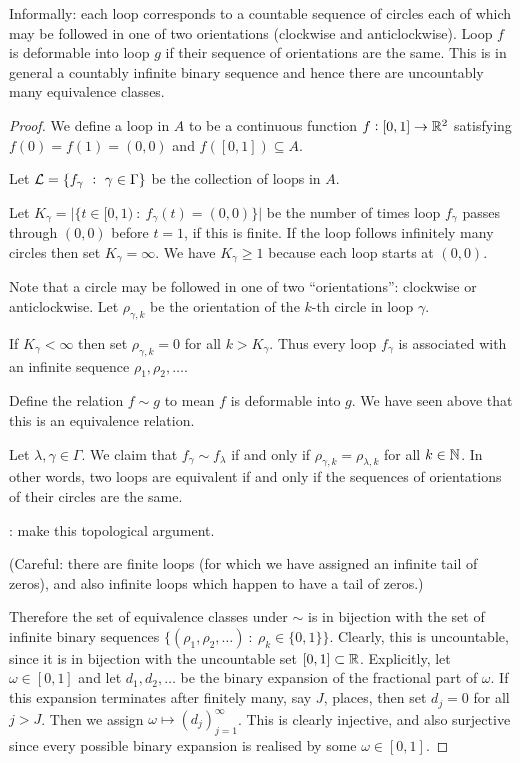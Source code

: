 \begin{enumerate}[label=(\alph*)]
  Informally: each loop corresponds to a countable sequence of circles each of which may be followed in one of
  two orientations (clockwise and anticlockwise). Loop $f$ is deformable into loop $g$ if their sequence of
  orientations are the same. This is in general a countably infinite binary sequence and hence there are
  uncountably many equivalence classes.

  \begin{proof}
    We define a loop in $A$ to be a continuous function $f: [0, 1] \to \mathbb{R}^2$ satisfying $f(0) = f(1) = (0, 0)$
    and $f([0, 1]) \subseteq A$.

    Let $\mathcal L = \{f_\gamma ~:~ \gamma \in \Gamma\}$ be the collection of loops in $A$.

    Let $K_\gamma = \big|\{t \in [0, 1) ~:~ f_\gamma(t) = (0, 0) \}\big|$ be the number of times
    loop $f_\gamma$ passes through $(0, 0)$ before $t = 1$, if this is finite. If the loop follows infinitely
    many circles then set $K_\gamma = \infty$. We have $K_\gamma \geq 1$ because each loop starts
    at $(0, 0)$.

    Note that a circle may be followed in one of two ``orientations​'': clockwise or anticlockwise.
    Let $\rho_{\gamma, k}$ be the orientation of the $k$-th circle in loop $\gamma$.

    If $K_\gamma < \infty$ then set $\rho_{\gamma, k} = 0$ for all $k > K_\gamma$. Thus every loop $f_\gamma$
    is associated with an infinite sequence $\rho_1, \rho_2, \ldots$.

    Define the relation $f \sim g$ to mean $f$ is deformable into $g$. We have seen above that this is an
    equivalence relation.

    Let $\lambda, \gamma \in \Gamma$. We claim that $f_\gamma \sim f_\lambda$ if and only
    if $\rho_{\gamma, k} = \rho_{\lambda, k}$ for all $k \in \mathbb{N}$. In other words, two loops are equivalent if
    and only if the sequences of orientations of their circles are the same.

    : make this topological argument.

    (Careful: there are finite loops (for which we have assigned an infinite tail of zeros), and also infinite
    loops which happen to have a tail of zeros.)

    Therefore the set of equivalence classes under $\sim$ is in bijection with the set of infinite binary
    sequences $\{(\rho_1, \rho_2, \ldots) ~:~ \rho_k \in \{0, 1\}\}$. Clearly, this is uncountable, since it is
    in bijection with the uncountable set $[0, 1] \subset \mathbb{R}$. Explicitly, let $\omega \in [0, 1]$ and
    let $d_1, d_2, \ldots$ be the binary expansion of the fractional part of $\omega$. If this expansion
    terminates after finitely many, say $J$, places, then set $d_j = 0$ for all $j > J$. Then we
    assign $\omega \mapsto (d_j)_{j=1}^\infty$. This is clearly injective, and also surjective since every
    possible binary expansion is realised by some $\omega \in [0, 1]$.
  \end{proof}
\end{enumerate}
